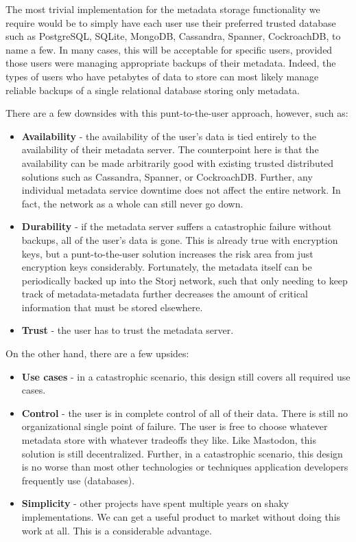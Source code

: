 \documentclass[a4paper,10pt]{article} \usepackage[utf8]{inputenc}
\begin{document}
The most trivial implementation for the metadata storage functionality we
require would be to simply have each user use their preferred trusted database
such as PostgreSQL, SQLite, MongoDB, Cassandra\cite{cassandra},
Spanner\cite{spanner}, CockroachDB, to name a few. In many cases, this will
be acceptable for specific users, provided those users were managing appropriate
backups of their metadata. Indeed, the types of users who have petabytes of data
to store can most likely manage reliable backups of a single relational database
storing only metadata.

There are a few downsides with this punt-to-the-user approach, however, such as:
\begin{itemize}
\item {\bf Availability} - the availability of the user's data
is tied entirely to the availability of their metadata server. The counterpoint
here is that the availability can be made arbitrarily good with existing trusted
distributed solutions such as Cassandra, Spanner, or CockroachDB. Further, any
individual metadata service downtime does not affect the entire network. In
fact, the network as a whole can still never go down.
\item {\bf Durability} -
if the metadata server suffers a catastrophic failure without backups, all of
the user's data is gone. This is already true with encryption keys, but a
punt-to-the-user solution increases the risk area from just encryption keys
considerably. Fortunately, the metadata itself can be periodically backed up
into the Storj network, 
such that only needing to keep track of metadata-metadata
further decreases the amount of critical information that must be stored
elsewhere.
\item {\bf Trust} - the user has to trust the metadata server.
\end{itemize}

On the other hand, there are a few upsides: \begin{itemize} \item {\bf Use
cases} - in a catastrophic scenario, this design still covers all required use
cases. \item {\bf Control} - the user is in complete control of all of their
data. There is still no organizational single point of failure. The user is free
to choose whatever metadata store with whatever tradeoffs they like. Like
Mastodon\cite{mastodon}, this solution is still decentralized. Further, in a
catastrophic scenario, this design is no worse than most other technologies or
techniques application developers frequently use (databases). \item {\bf
Simplicity} - other projects have spent multiple years on shaky implementations.
We can get a useful product to market without doing this work at all. This is a
considerable advantage. \end{itemize}
\end{document}
